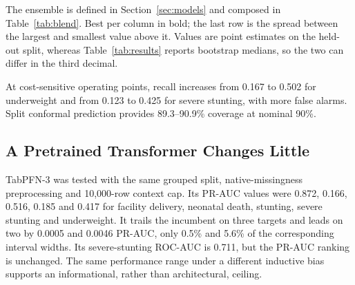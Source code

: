 \documentclass[conference]{IEEEtran}
\begin{document}
\begin{table}[t]
\caption{Test ROC-AUC by learner and target.
\textnormal{\textbf{Ensemble}} is not an eighth learner: it is the greedy
PR-AUC-weighted blend of the seven rows above it}
\label{tab:models}
\centering
\small
{}
\par\vspace{2pt}\parbox{\columnwidth}{\footnotesize The ensemble is defined in
Section~\ref{sec:models} and composed in Table~\ref{tab:blend}. Best per
column in bold; the last row is the spread between the largest and smallest
value above it. Values are point estimates on the held-out split, whereas
Table~\ref{tab:results} reports bootstrap medians, so the two can differ in
the third decimal.}
\end{table}

At cost-sensitive operating points, recall increases from 0.167 to 0.502 for
underweight and from 0.123 to 0.425 for severe stunting, with more false
alarms. Split conformal prediction provides 89.3--90.9\% coverage at nominal
90\%.

\subsection{A Pretrained Transformer Changes Little}
\label{sec:tabpfn}
TabPFN-3 was tested with the same grouped split, native-missingness
preprocessing and 10{,}000-row context cap. Its PR-AUC values were 0.872,
0.166, 0.516, 0.185 and 0.417 for facility delivery, neonatal death,
stunting, severe stunting and underweight. It trails the incumbent on three
targets and leads on two by 0.0005 and 0.0046 PR-AUC, only 0.5\% and 5.6\% of
the corresponding interval widths. Its severe-stunting ROC-AUC is 0.711, but
the PR-AUC ranking is unchanged. The same performance range under a different
inductive bias supports an informational, rather than architectural, ceiling.
\end{document}
